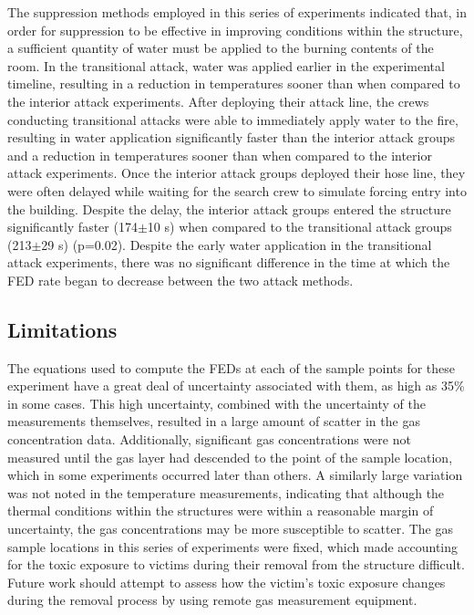 \documentclass[12pt,oneside]{article}
\begin{document}
The suppression methods employed in this series of experiments indicated that, in order for suppression to be effective in improving conditions within the structure, a sufficient quantity of water must be applied to the burning contents of the room. In the transitional attack, water was applied earlier in the experimental timeline, resulting in a reduction in temperatures sooner than when compared to the interior attack experiments. After deploying their attack line, the crews conducting transitional attacks were able to immediately apply water to the fire, resulting in water application significantly faster than the interior attack groups and a reduction in temperatures sooner than when compared to the interior attack experiments. Once the interior attack groups deployed their hose line, they were often delayed while waiting for the search crew to simulate forcing entry into the building. Despite the delay, the interior attack groups entered the structure significantly faster (174$\pm$10 s) when compared to the transitional attack groups (213$\pm$29 s) (p=0.02). Despite the early water application in the transitional attack experiments, there was no significant difference in the time at which the FED rate began to decrease between the two attack methods. 

\subsection{Limitations}
 The equations used to compute the FEDs at each of the sample points for these experiment have a great deal of uncertainty associated with them, as high as 35\% in some cases. This high uncertainty, combined with the uncertainty of the measurements themselves, resulted in a large amount of scatter in the gas concentration data. Additionally, significant gas concentrations were not measured until the gas layer had descended to the point of the sample location, which in some experiments occurred later than others. A similarly large variation  was not noted in the temperature measurements, indicating that although the thermal conditions within the structures were within a reasonable margin of uncertainty, the gas concentrations may be more susceptible to scatter. The gas sample locations in this series of experiments were fixed, which made accounting for the toxic exposure to victims during their removal from the structure difficult. Future work should attempt to assess how the victim's toxic exposure changes during the removal process by using remote gas measurement equipment. 
\end{document}
